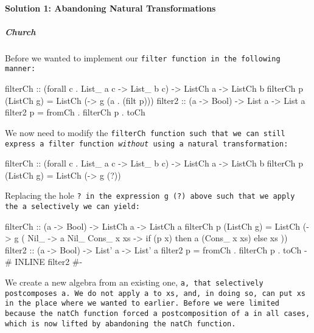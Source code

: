 \paragraph{Solution 1: Abandoning Natural Transformations}
\subparagraph{Church} Before we wanted to implement our \tt{filter} function in the following manner:
\begin{spec}
filterCh :: (forall c . List_ a c -> List_ b c) -> ListCh a -> ListCh b
filterCh p (ListCh g) = ListCh (\a -> g (a . (filt p)))
filter2 :: (a -> Bool) -> List a -> List a
filter2 p = fromCh . filterCh p . toCh
\end{spec}
We now need to modify the \tt{filterCh} function such that we can still express a filter function \textit{without} using a natural transformation:
\begin{spec}
filterCh :: (forall c . List_ a c -> List_ b c) -> ListCh a -> ListCh b
filterCh p (ListCh g) = ListCh (\a -> g (?))
\end{spec}
Replacing the hole \tt{?} in the expression \tt{g (?)} above such that we apply the \tt{a} selectively we can yield:
\begin{code}
filterCh :: (a -> Bool) -> ListCh a -> ListCh a
filterCh p (ListCh g) = ListCh (\a -> g (\case
    Nil_ -> a Nil_
    Cons_ x xs -> if (p x) then a (Cons_ x xs) else xs
  ))
filter2 :: (a -> Bool) -> List' a -> List' a
filter2 p = fromCh . filterCh p . toCh
{-# INLINE filter2 #-}
\end{code}
We create a new algebra from an existing one, \tt{a}, that selectively postcomposes \tt{a}.
We do not apply \tt{a} to \tt{xs}, and, in doing so, can put \tt{xs} in the place where we wanted to earlier.
Before we were limited because the \tt{natCh} function forced a postcomposition of \tt{a} in all cases, which is now lifted by abandoning the \tt{natCh} function.



